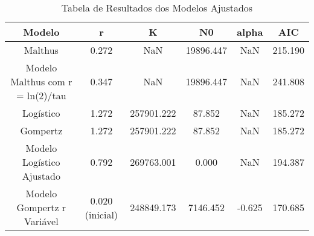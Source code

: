 \begin{table}[h]
\centering
\caption{Tabela de Resultados dos Modelos Ajustados}
\label{tab:resultados_modelos}
\begin{tabular}{cccccc}
\toprule
Modelo & r & K & N0 & alpha & AIC \\
\midrule
Malthus & 0.272 & NaN & 19896.447 & NaN & 215.190 \\
Modelo Malthus com r = ln(2)/tau & 0.347 & NaN & 19896.447 & NaN & 241.808 \\
Logístico & 1.272 & 257901.222 & 87.852 & NaN & 185.272 \\
Gompertz & 1.272 & 257901.222 & 87.852 & NaN & 185.272 \\
Modelo Logístico Ajustado & 0.792 & 269763.001 & 0.000 & NaN & 194.387 \\
Modelo Gompertz r Variável & 0.020 (inicial) & 248849.173 & 7146.452 & -0.625 & 170.685 \\
\bottomrule
\end{tabular}
\end{table}